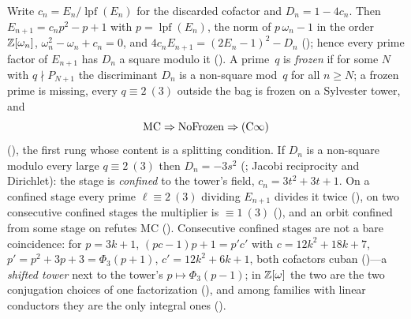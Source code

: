 \documentclass[10pt,a4paper]{article}
\newcommand{\lpf}{\operatorname{lpf}}
\newcommand{\Cinf}{(\mathrm{C}\infty)}
\begin{document}
Write $c_n=E_n/\lpf(E_n)$ for the discarded cofactor and $D_n=1-4c_n$.
Then $E_{n+1}=c_np^2-p+1$ with $p=\lpf(E_n)$, the norm of $p\,\omega_n-1$
in the order $\mathbb{Z}[\omega_n]$, $\omega_n^2-\omega_n+c_n=0$, and
$4c_nE_{n+1}=(2E_n-1)^2-D_n$
(); hence
every prime factor of $E_{n+1}$ has $D_n$ a square modulo it
().  A
prime~$q$ is \emph{frozen} if for some $N$ with $q\nmid P_{N+1}$ the
discriminant $D_n$ is a non-square mod~$q$ for all $n\ge N$; a
frozen prime is missing, every $q\equiv2\ (3)$ outside the bag is frozen on
a Sylvester tower, and
\[
  \MC\Rightarrow\mathrm{NoFrozen}\Rightarrow\Cinf
\]
(), the first rung whose
content is a splitting condition.  If $D_n$ is a non-square modulo every
large $q\equiv2\ (3)$ then $D_n=-3s^2$
(;
Jacobi reciprocity and Dirichlet): the stage is \emph{confined} to the
tower's field, $c_n=3t^2+3t+1$.  On a confined stage every prime
$\ell\equiv2\ (3)$ dividing $E_{n+1}$ divides it twice
(), on two
consecutive confined stages the multiplier is $\equiv1\ (3)$
(),
and an orbit confined from some stage on refutes MC
().
Consecutive confined stages are not a bare coincidence: for $p=3k+1$,
$(pc-1)p+1=p'c'$ with $c=12k^2+18k+7$, $p'=p^2+3p+3=\Phi_3(p{+}1)$,
$c'=12k^2+6k+1$, both cofactors cuban
()---a
\emph{shifted tower} next to the tower's $p\mapsto\Phi_3(p{-}1)$; in
$\mathbb{Z}[\omega]$ the two are the two conjugation choices of one factorization
(),
and among families with linear conductors they are the only integral ones
().
\end{document}
